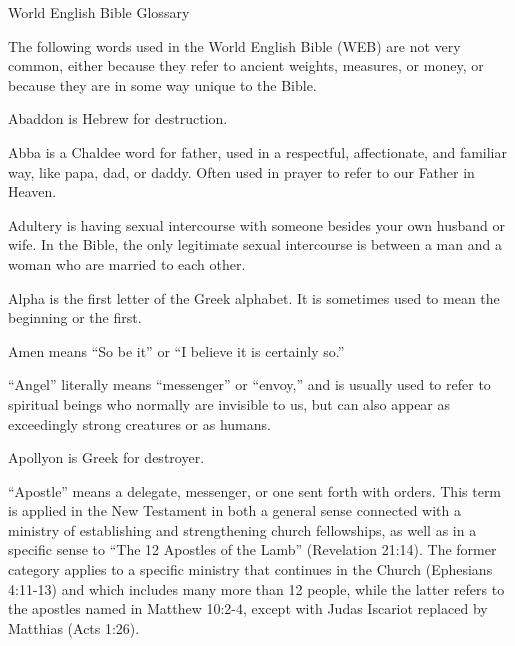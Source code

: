 ﻿\NormalFont{}
{\MT World English Bible Glossary
\par }{\IP The following words used in the World English Bible (WEB) are not very common, either because they refer to ancient weights, measures, or money, or because they are in some way unique to the Bible.
\par }{
\par }{\ILIB Abaddon is Hebrew for destruction.
\par }{
\par }{\ILIB Abba is a Chaldee word for father, used in a respectful, affectionate, and familiar way, like papa, dad, or daddy. Often used in prayer to refer to our Father in Heaven.
\par }{
\par }{\ILIB Adultery is having sexual intercourse with someone besides your own husband or wife. In the Bible, the only legitimate sexual intercourse is between a man and a woman who are married to each other.
\par }{
\par }{\ILIB Alpha is the first letter of the Greek alphabet. It is sometimes used to mean the beginning or the first.
\par }{
\par }{\ILIB Amen means “So be it” or “I believe it is certainly so.”
\par }{
\par }{\ILIB “Angel” literally means “messenger” or “envoy,” and is usually used to refer to spiritual beings who normally are invisible to us, but can also appear as exceedingly strong creatures or as humans.
\par }{
\par }{\ILIB Apollyon is Greek for destroyer.
\par }{
\par }{\ILIB “Apostle” means a delegate, messenger, or one sent forth with orders. This term is applied in the New Testament in both a general sense connected with a ministry of establishing and strengthening church fellowships, as well as in a specific sense to “The 12 Apostles of the Lamb” (Revelation 21:14). The former category applies to a specific ministry that continues in the Church (Ephesians 4:11-13) and which includes many more than 12 people, while the latter refers to the apostles named in Matthew 10:2-4, except with Judas Iscariot replaced by Matthias (Acts 1:26).
}
